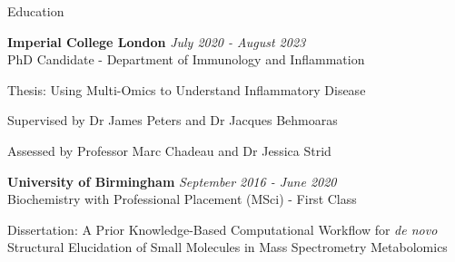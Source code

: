 \documentclass{resume}
\begin{document}

\begin{rSection}{Education}

\vspace{1pt plus 1pt}
{\bf Imperial College London} \hfill {\em July 2020 - August 2023} 
\\ PhD Candidate - Department of Immunology and Inflammation

\vspace{2pt plus 1pt minus 1pt}
\item Thesis: Using Multi-Omics to Understand Inflammatory Disease
\item Supervised by Dr James Peters and Dr Jacques Behmoaras 
\item Assessed by Professor Marc Chadeau and Dr Jessica Strid

\smallskip

{\bf University of Birmingham} \hfill {\em September 2016 - June 2020} 
\\ Biochemistry with Professional Placement (MSci) - First Class

\vspace{2pt plus 1pt minus 1pt}
\item Dissertation: A Prior Knowledge-Based Computational Workflow for \textit{de novo} Structural Elucidation of Small Molecules in Mass Spectrometry Metabolomics

\end{rSection}

\end{document}
